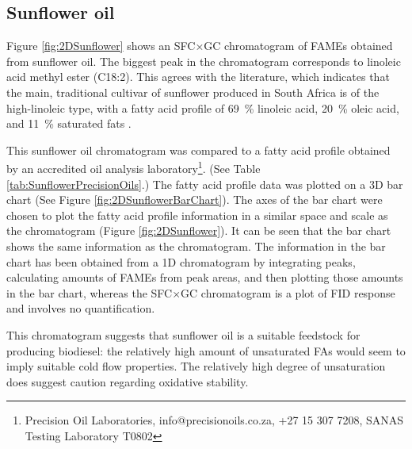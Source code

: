 \subsection{Sunflower oil}

Figure \ref{fig:2DSunflower} shows an SFC×GC chromatogram of FAMEs obtained from
sunflower oil. The biggest peak in the chromatogram corresponds to linoleic acid
methyl ester (C18:2). This agrees with the literature, which indicates that the
main, traditional cultivar of sunflower produced in South Africa is of the
high-linoleic type, with a fatty acid profile of \SI{69}{\percent} linoleic
acid, \SI{20}{\percent} oleic acid, and \SI{11}{\percent} saturated fats
\autocite {JFAOWHOCAC2019}.

This sunflower oil chromatogram was compared to a fatty acid profile obtained by
an accredited oil analysis laboratory\footnote{Precision Oil Laboratories,
info@precisionoils.co.za,  +27 15 307 7208, SANAS Testing Laboratory T0802}.
(See Table \ref{tab:SunflowerPrecisionOils}.) The fatty acid profile data was
plotted on a 3D bar chart (See Figure \ref{fig:2DSunflowerBarChart}). The axes
of the bar chart were chosen to plot the fatty acid profile information in a
similar space and scale as the chromatogram (Figure \ref{fig:2DSunflower}). It
can be seen that the bar chart shows the same information as the chromatogram.
The information in the bar chart has been obtained from a 1D chromatogram by
integrating peaks, calculating amounts of FAMEs from peak areas, and then
plotting those amounts in the bar chart, whereas the SFC×GC chromatogram is a
plot of FID response and involves no quantification.

This chromatogram suggests that sunflower oil is a suitable feedstock for
producing biodiesel: the relatively high amount of unsaturated FAs would seem to
imply suitable cold flow properties. The relatively high degree of unsaturation
does suggest caution regarding oxidative stability.

